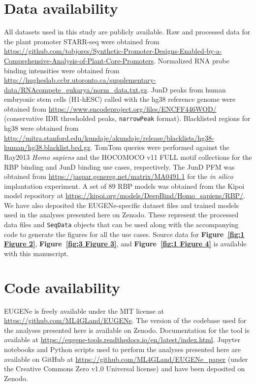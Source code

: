 \section{Data availability}

All datasets used in this study are publicly available. Raw and processed data for the plant promoter STARR-seq were obtained from \url{https://github.com/tobjores/Synthetic-Promoter-Designs-Enabled-by-a-Comprehensive-Analysis-of-Plant-Core-Promoters}. Normalized RNA probe binding intensities were obtained from \url{http://hugheslab.ccbr.utoronto.ca/supplementary-data/RNAcompete_eukarya/norm_data.txt.gz}. JunD peaks from human embryonic stem cells (H1-hESC) called with the hg38 reference genome were obtained from \url{https://www.encodeproject.org/files/ENCFF446WOD/} (conservative IDR thresholded peaks, \texttt{narrowPeak} format). Blacklisted regions for hg38 were obtained from \url{http://mitra.stanford.edu/kundaje/akundaje/release/blacklists/hg38-human/hg38.blacklist.bed.gz}. TomTom queries were performed against the Ray2013 \textit{Homo sapiens} and the HOCOMOCO v11 FULL motif collections for the RBP binding and JunD binding use cases, respectively. The JunD PFM was obtained from \url{https://jaspar.genereg.net/matrix/MA0491.1} for the \textit{in silico} implantation experiment. A set of 89 RBP models was obtained from the Kipoi model repository at \url{https://kipoi.org/models/DeepBind/Homo_sapiens/RBP/}. We have also deposited the EUGENe-specific dataset files and trained models used in the analyses presented here on Zenodo\cite{Klie2023-vf}. These represent the processed data files and \texttt{SeqData} objects that can be used along with the accompanying code to generate the figures for all the use cases. Source data for \textbf{Figure~\ref{fig:1 Figure 2}}, \textbf{Figure~\ref{fig:3 Figure 3}}, and \textbf{Figure~\ref{fig:1 Figure 4}} is available with this manuscript.

\section{Code availability}

EUGENe is freely available under the MIT license at \url{https://github.com/ML4GLand/EUGENe}. The version of the codebase used for the analyses presented here is available on Zenodo\cite{Klie2023-gx}. Documentation for the tool is available at \url{https://eugene-tools.readthedocs.io/en/latest/index.html}. Jupyter notebooks and Python scripts used to perform the analyses presented here are available on GitHub at \url{https://github.com/ML4GLand/EUGENe_paper} (under the Creative Commons Zero v1.0 Universal license) and have been deposited on Zenodo\cite{Klie2023-ku}.


